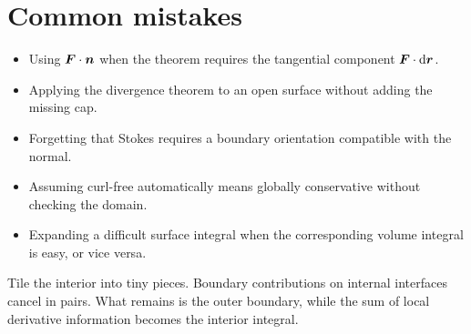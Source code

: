 \documentclass[11pt,a4paper]{article}
\begin{document}
\section{Common mistakes}

\begin{itemize}
\item Using $\bm{F}\cdot\bm{n}$ when the theorem requires the tangential component $\bm{F}\cdot\mathop{}\!\mathrm d\bm{r}$.
\item Applying the divergence theorem to an open surface without adding the missing cap.
\item Forgetting that Stokes requires a boundary orientation compatible with the normal.
\item Assuming curl-free automatically means globally conservative without checking the domain.
\item Expanding a difficult surface integral when the corresponding volume integral is easy, or vice versa.
\end{itemize}

\begin{checkBox}
Tile the interior into tiny pieces. Boundary contributions on internal interfaces cancel in pairs. What remains is the outer boundary, while the sum of local derivative information becomes the interior integral.
\end{checkBox}
\end{document}
